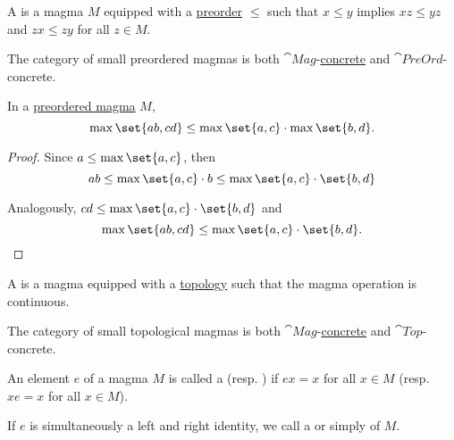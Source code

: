 \begin{definition}\label{def:preordered_magma}
  A  is a magma \( M \) equipped with a \hyperref[def:preordered_set]{preorder} \( \leq \) such that \( x \leq y \) implies \( xz \leq yz \) and \( zx \leq zy \) for all \( z \in M \).

  The category of small preordered magmas is both \hyperref[def:magma/category]{\( \cat{Mag} \)}-\hyperref[def:concrete_category]{concrete} and \hyperref[def:preordered_set/category]{\( \cat{PreOrd} \)}-concrete.
\end{definition}

\begin{proposition}\label{thm:preordered_magma_max_distributivity}
  In a \hyperref[def:preordered_magma]{preordered magma} \( M \),
  \begin{equation}\label{eq:thm:preordered_magma_max_distributivity}
    \max \set{a b, c d} \leq \max \set{a, c} \cdot \max \set{b, d}.
  \end{equation}
\end{proposition}
\begin{proof}
  Since \( a \leq \max \set{a, c} \), then
  \begin{equation*}
    ab
    \leq
    \max \set{a, c} \cdot b
    \leq
    \max \set{a, c} \cdot \set{b, d}
  \end{equation*}

  Analogously, \( cd \leq \max \set{a, c} \cdot \set{b, d} \) and
  \begin{equation*}
    \max \set{a b, c d} \leq \max \set{a, c} \cdot \set{b, d}.
  \end{equation*}
\end{proof}

\begin{definition}\label{def:topological_magma}
  A  is a magma equipped with a \hyperref[def:topological_space]{topology} such that the magma operation is continuous.

  The category of small topological magmas is both \hyperref[def:magma/category]{\( \cat{Mag} \)}-\hyperref[def:concrete_category]{concrete} and \hyperref[def:category_of_small_topological_spaces]{\( \cat{Top} \)}-concrete.
\end{definition}

\begin{definition}\label{def:magma_identity}
  An element \( e \) of a magma \( M \) is called a  (resp. ) if \( ex = x \) for all \( x \in M \) (resp. \( xe = x \) for all \( x \in M \)).

  If \( e \) is simultaneously a left and right identity, we call a  or simply  of \( M \).
\end{definition}

